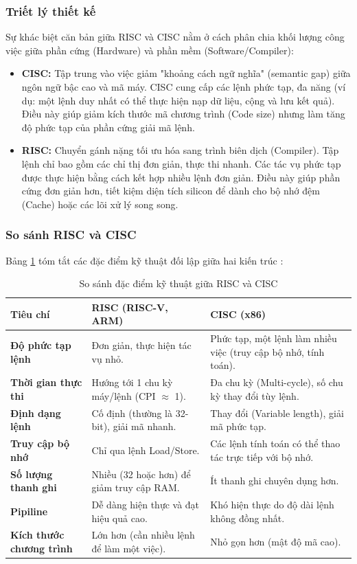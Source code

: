 \subsubsection{Triết lý thiết kế}
Sự khác biệt căn bản giữa RISC và CISC nằm ở cách phân chia khối lượng công việc giữa phần cứng (Hardware) và phần mềm (Software/Compiler):

\begin{itemize}
    \item \textbf{CISC:} Tập trung vào việc giảm "khoảng cách ngữ nghĩa" (semantic gap) giữa ngôn ngữ bậc cao và mã máy. CISC cung cấp các lệnh phức tạp, đa năng (ví dụ: một lệnh duy nhất có thể thực hiện nạp dữ liệu, cộng và lưu kết quả). Điều này giúp giảm kích thước mã chương trình (Code size) nhưng làm tăng độ phức tạp của phần cứng giải mã lệnh.
    \item \textbf{RISC:} Chuyển gánh nặng tối ưu hóa sang trình biên dịch (Compiler). Tập lệnh chỉ bao gồm các chỉ thị đơn giản, thực thi nhanh. Các tác vụ phức tạp được thực hiện bằng cách kết hợp nhiều lệnh đơn giản. Điều này giúp phần cứng đơn giản hơn, tiết kiệm diện tích silicon để dành cho bộ nhớ đệm (Cache) hoặc các lõi xử lý song song.
\end{itemize}



\subsubsection{So sánh RISC và CISC}
Bảng \ref{tab:risc_vs_cisc} tóm tắt các đặc điểm kỹ thuật đối lập giữa hai kiến trúc \cite{risc-v}:

\begin{table}[h]
\centering
\begin{tabular}{|p{4cm}|p{5.5cm}|p{5.5cm}|}
\hline
\textbf{Tiêu chí} & \textbf{RISC (RISC-V, ARM)} & \textbf{CISC (x86)} \\ \hline
\textbf{Độ phức tạp lệnh} & Đơn giản, thực hiện tác vụ nhỏ. & Phức tạp, một lệnh làm nhiều việc (truy cập bộ nhớ, tính toán). \\ \hline
\textbf{Thời gian thực thi} & Hướng tới 1 chu kỳ máy/lệnh (CPI $\approx$ 1). & Đa chu kỳ (Multi-cycle), số chu kỳ thay đổi tùy lệnh. \\ \hline
\textbf{Định dạng lệnh} & Cố định (thường là 32-bit), giải mã nhanh. & Thay đổi (Variable length), giải mã phức tạp. \\ \hline
\textbf{Truy cập bộ nhớ} & Chỉ qua lệnh Load/Store. & Các lệnh tính toán có thể thao tác trực tiếp với bộ nhớ. \\ \hline
\textbf{Số lượng thanh ghi} & Nhiều (32 hoặc hơn) để giảm truy cập RAM. & Ít thanh ghi chuyên dụng hơn. \\ \hline
\textbf{Pipiline} & Dễ dàng hiện thực và đạt hiệu quả cao. & Khó hiện thực do độ dài lệnh không đồng nhất. \\ \hline
\textbf{Kích thước chương trình} & Lớn hơn (cần nhiều lệnh để làm một việc). & Nhỏ gọn hơn (mật độ mã cao). \\ \hline
\end{tabular}
\caption{So sánh đặc điểm kỹ thuật giữa RISC và CISC}
\label{tab:risc_vs_cisc}
\end{table}

